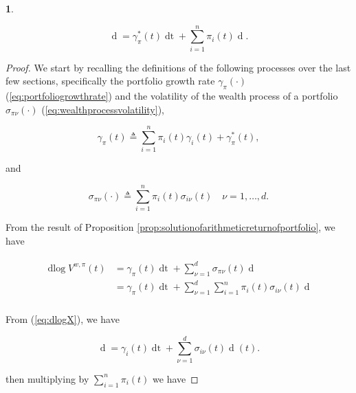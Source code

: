 \documentclass[british]{amsart} \usepackage{lmodern}
\numberwithin{equation}{section} \numberwithin{figure}{section}
\theoremstyle{plain} \newtheorem{thm}{\protect\theoremname}[section]
\theoremstyle{definition} \newtheorem{defn}[thm]{\protect\definitionname}
\theoremstyle{plain} \newtheorem{assumption}[thm]{\protect\assumptionname}
\theoremstyle{plain} \newtheorem{lem}[thm]{\protect\lemmaname}
\theoremstyle{plain} \newtheorem{prop}[thm]{\protect\propositionname}
\theoremstyle{remark} \newtheorem{rem}[thm]{\protect\remarkname}
\theoremstyle{plain} \newtheorem{cor}[thm]{\protect\corollaryname}
\renewcommand{\d}[1]{\mathop{\mathrm{d}{#1}}}
\newcommand{\defeq}{\mathop{\triangleq}} \newcommand{\almostsurely}{\text{a.s.}}
\newcommand{\V}{V^{w,\pi}}
\begin{document}
\begin{prop}
  \label{prop:dlogV}

  \begin{equation}
      \d{\log V^{\pi}(t)} = \gamma_{\pi}^{*}(t)\d{t} + \sum_{i=1}^{n} \pi_{i}(t) \d{\log{X_{i}(t)}}.
  \end{equation}

\end{prop}

\begin{proof}
  We start by recalling the definitions of the following processes over the last
  few sections, specifically the portfolio growth rate $\gamma_{\pi}(\cdot)$
  (\ref{eq:portfoliogrowthrate}) and the volatility of the wealth process of a
  portfolio $\sigma_{\pi\nu}(\cdot)$ (\ref{eq:wealthprocessvolatility}), 
  
  \begin{equation}
    \gamma_{\pi}(t) \defeq 
      \sum_{i=1}^{n} \pi_{i}(t)\gamma_{i}(t) + \gamma_{\pi}^{*}(t),
  \end{equation}

  and

  \begin{equation}
    \sigma_{\pi\nu}(\cdot) \defeq \sum_{i=1}^{n} \pi_{i}(t) \sigma_{i\nu}(t)
    \quad \nu=1,\dots,d.
  \end{equation}

  From the result of Proposition
\ref{prop:solutionofarithmeticreturnofportfolio}, we have 

  \begin{gather}
    \begin{split}
      \label{eq:dlogVstep1}
      \d\log{\V(t)} 
      &=  
        \gamma_{\pi}(t) \d{t} +
        \sum_{\nu=1}^{d} \sigma_{\pi\nu}(t) \d{W_{\nu}(t)} \\
      &=
        \gamma_{\pi}(t) \d{t} +
        \sum_{\nu=1}^{d} \sum_{i=1}^{n} \pi_{i}(t) \sigma_{i\nu}(t) \d{W_{\nu}(t)} \\
    \end{split}
  \end{gather}

  From (\ref{eq:dlogX}), we have

  \begin{equation}
        \d{\log{X_{i}(t)}} =
          \gamma_{i}(t) \d{t} +
          \sum_{\nu=1}^{d} \sigma_{i\nu}(t) \d{W_{\nu}}(t).
  \end{equation}

  then multiplying by $\sum_{i=1}^{n} \pi_{i}(t)$ we have 
 

\end{proof}
\end{document}
